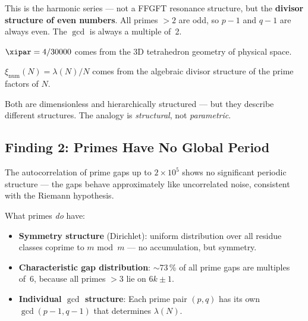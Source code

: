 This is the harmonic series --- not a
FFGFT resonance structure, but the
\textbf{divisor structure of even numbers}.
All primes $> 2$ are odd,
so $p-1$ and $q-1$ are always even.
The $\gcd$ is always a multiple of~2.

\begin{keypoint}
$\xipar = 4/30000$ comes from the
3D tetrahedron geometry of physical space.

$\xi_\text{num}(N) = \lambda(N)/N$ comes from the
algebraic divisor structure of the prime factors of $N$.

Both are dimensionless and hierarchically structured ---
but they describe different structures.
The analogy is \emph{structural}, not \emph{parametric}.
\end{keypoint}

\subsection{Finding 2: Primes Have No Global Period}

The autocorrelation of prime gaps up to $2 \times 10^5$
shows no significant periodic structure ---
the gaps behave approximately like
uncorrelated noise, consistent with the
Riemann hypothesis.

What primes \emph{do} have:
\begin{itemize}
  \item \textbf{Symmetry structure} (Dirichlet):
    uniform distribution over all residue classes
    coprime to $m$ mod~$m$ --- no accumulation,
    but symmetry.
  \item \textbf{Characteristic gap distribution}:
    $\sim$73\,\% of all prime gaps are multiples
    of~6, because all primes $> 3$ lie on $6k \pm 1$.
  \item \textbf{Individual $\gcd$ structure}:
    Each prime pair $(p, q)$ has its own
    $\gcd(p-1, q-1)$ that determines $\lambda(N)$.
\end{itemize}

